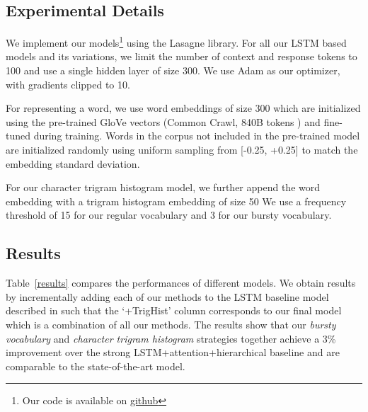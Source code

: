 \documentclass[11pt]{report}
\renewcommand\cite{\citep}	%
\begin{document}
\subsection{Experimental Details}
We implement our models\footnote{Our code is available on \href{http://github.com/raosudha89/ubuntu_dialogue}{github} } using the Lasagne \cite{lasagne} library. For all our LSTM based models and its variations, we limit the number of context and response tokens to 100 and use a single hidden layer of size 300. We use Adam \cite{kingma2014adam} as our optimizer, with gradients clipped to 10. 

For representing a word, we use word embeddings of size 300 which are initialized using the pre-trained GloVe vectors (Common Crawl, 840B tokens \cite{pennington2014glove}) and fine-tuned during training. Words in the corpus not included in the pre-trained model are initialized randomly using uniform sampling from [-0.25, +0.25] to match the embedding standard deviation. 

For our character trigram histogram model, we further append the word embedding with a trigram histogram embedding of size 50 %
We use a frequency threshold of 15 for our regular vocabulary and 3 for our bursty vocabulary.  

\subsection{Results}
Table~\ref{results} compares the performances of different models. We obtain results by incrementally adding each of our methods to the LSTM baseline model described in \cite{lowe2015ubuntu} such that the `+TrigHist' column corresponds to our final model which is a combination of all our methods.
The results show that our \textit{bursty vocabulary}  and \textit{character trigram histogram} strategies together achieve a 3\% improvement over the strong LSTM+attention+hierarchical baseline and are comparable to the state-of-the-art model. 
\end{document}
